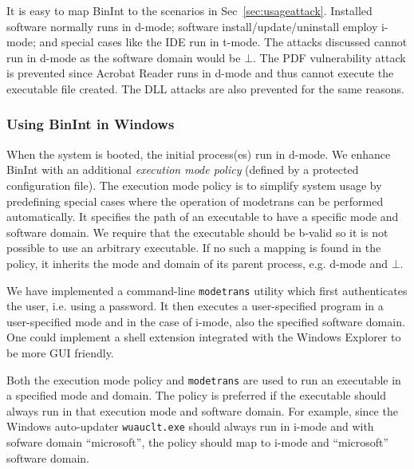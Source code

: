 It is easy to map BinInt to the scenarios in Sec~\ref{sec:usageattack}.
Installed software normally runs in d-mode;
software install/up\-date/uninstall employ i-mode;
and special cases like the IDE run in t-mode.
The attacks discussed cannot run in d-mode as the software
domain would be $\bot$.
The PDF vulnerability attack is prevented since Acrobat Reader
runs in d-mode and thus cannot execute the executable file created.
The DLL attacks are also prevented for the same reasons.

\subsubsection{Using BinInt in Windows}

When the system is booted, the initial process(es) run in d-mode.
We enhance  BinInt with an additional
{\em execution mode policy} (defined by a protected configuration file).
The execution mode policy is to simplify system usage by predefining
special cases where the operation of modetrans can be performed
automatically.
It specifies the path of an 
executable to have a specific mode and software domain.
We require that the executable should be b-valid so it is not possible
to use an arbitrary executable.
If no such a mapping is found in the policy, 
it inherits the mode and domain of its parent process, e.g. d-mode and $\bot$.

We have implemented a command-line {\tt modetrans} utility which
first authenticates the user, i.e. using a password.
It then executes a user-specified program in a user-specified mode and 
in the case of i-mode, also the specified software domain.
One could implement a shell extension integrated with the Windows Explorer
to be more GUI friendly.

Both the execution mode policy and {\tt modetrans} are used to run an 
executable in a specified mode and domain.
The policy is preferred if the executable should always run
in that execution mode and software domain.
For example, since the Windows auto-updater {\tt wuauclt.exe} should
always run in i-mode and with sofware domain ``microsoft'', the policy
should map 
to i-mode and ``microsoft'' software domain.
